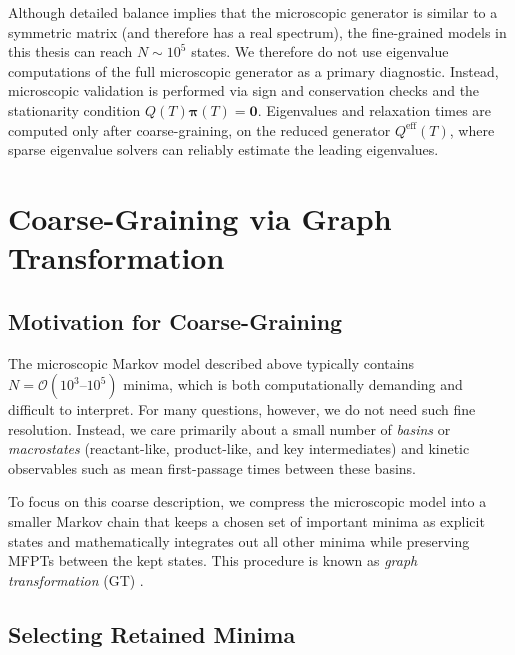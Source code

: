 Although detailed balance implies that the microscopic generator is similar to a
symmetric matrix (and therefore has a real spectrum), the fine-grained models in this
thesis can reach $N\sim 10^5$ states. We therefore do not use eigenvalue computations
of the full microscopic generator as a primary diagnostic. Instead, microscopic
validation is performed via sign and conservation checks and the stationarity condition
$Q(T)\boldsymbol{\pi}(T)=\mathbf{0}$. Eigenvalues and relaxation times are computed
only after coarse-graining, on the reduced generator $Q^{\mathrm{eff}}(T)$, where
sparse eigenvalue solvers can reliably estimate the leading eigenvalues.



\section{Coarse-Graining via Graph Transformation}\label{sec:gt}

\subsection{Motivation for Coarse-Graining}\label{subsec:cg-motivation}

The microscopic Markov model described above typically contains
$N = \mathcal{O}(10^3\text{--}10^5)$ minima, which is both computationally demanding
and difficult to interpret. For many questions, however, we do not need such fine
resolution. Instead, we care primarily about a small number of \emph{basins} or
\emph{macrostates} (reactant-like, product-like, and key intermediates) and kinetic
observables such as mean first-passage times between these basins.

To focus on this coarse description, we compress the microscopic model into a smaller
Markov chain that keeps a chosen set of important minima as explicit states and
mathematically integrates out all other minima while preserving MFPTs between the kept
states. This procedure is known as \emph{graph transformation} (GT)
\cite{Trygubenko2006GT,Stevenson2014GT,Wales2024FPT}.


\subsection{Selecting Retained Minima}\label{subsec:keep-selection}

